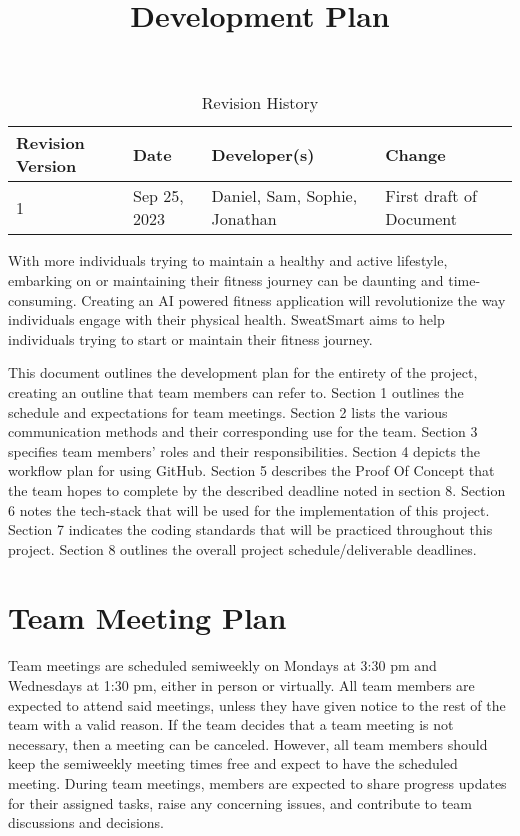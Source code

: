 \documentclass{article}
\title{Development Plan\\\progname}
\author{\authname}  %
\date{}
\begin{document}
	\maketitle
	\begin{table}[hp]
		\centering
		\caption{Revision History} \label{TblRevisionHistory}
		\begin{tabularx}{\textwidth}{lllX}
			\toprule
			\textbf{Revision Version} & \textbf{Date} & \textbf{Developer(s)} & \textbf{Change}\\
			\midrule
			1 & Sep 25, 2023 & Daniel, Sam, Sophie, Jonathan & First draft of Document\\
			\bottomrule
		\end{tabularx}
	\end{table}
	\vspace{0.5cm}
	\maketitle

	With more individuals trying to maintain a healthy and active lifestyle, embarking on or maintaining their fitness journey can be daunting and time-consuming. Creating an AI powered fitness application will revolutionize the way individuals engage with their physical health. SweatSmart aims to help individuals trying to start or maintain their fitness journey.

	This document outlines the development plan for the entirety of the project, creating an outline that team members can refer to. Section 1 outlines the schedule and expectations for team meetings. Section 2 lists the various communication methods and their corresponding use for the team. Section 3 specifies team members’ roles and their responsibilities. Section 4 depicts the workflow plan for using GitHub. Section 5 describes the Proof Of Concept that the team hopes to complete by the described deadline noted in section 8. Section 6 notes the tech-stack that will be used for the implementation of this project. Section 7 indicates the coding standards that will be practiced throughout this project. Section 8 outlines the overall project schedule/deliverable deadlines.


	\section{Team Meeting Plan}

	Team meetings are scheduled semiweekly on Mondays at 3:30 pm and Wednesdays at 1:30 pm, either in person or virtually. All team members are expected to attend said meetings, unless they have given notice to the rest of the team with a valid reason. If the team decides that a team meeting is not necessary, then a meeting can be canceled. However, all team members should keep the semiweekly meeting times free and expect to have the scheduled meeting. During team meetings, members are expected to share progress updates for their assigned tasks, raise any concerning issues, and contribute to team discussions and decisions.
\end{document}

